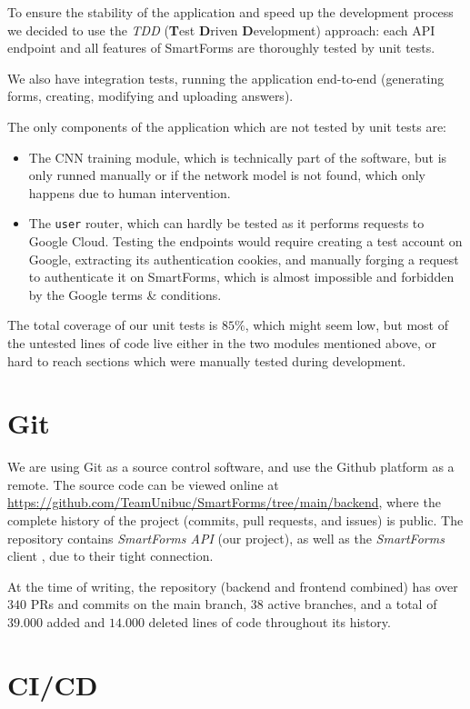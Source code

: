 \documentclass[11pt, a4paper]{report}
\def\code#1{\texttt{#1}}
\begin{document}
To ensure the stability of the application and speed up the development process we decided to use the \textit{TDD} (\textbf{T}est \textbf{D}riven \textbf{D}evelopment) approach: each API endpoint and all features of SmartForms are thoroughly tested by unit tests.

We also have integration tests, running the application end-to-end (generating forms, creating, modifying and uploading answers).

The only components of the application which are not tested by unit tests are:
\begin{itemize}
	\item The CNN training module, which is technically part of the software, but is only runned manually or if the network model is not found, which only happens due to human intervention.
	\item The \code{user} router, which can hardly be tested as it performs requests to Google Cloud. Testing the endpoints would require creating a test account on Google, extracting its authentication cookies, and manually forging a request to authenticate it on SmartForms, which is almost impossible and forbidden by the Google terms \& conditions. 
\end{itemize}

The total coverage of our unit tests is $85\%$, which might seem low, but most of the untested lines of code live either in the two modules mentioned above, or hard to reach sections which were manually tested during development.

\section{Git}

We are using Git\cite{Git} as a source control software, and use the Github platform as a remote. The source code can be viewed online at \url{https://github.com/TeamUnibuc/SmartForms/tree/main/backend}, where the complete history of the project (commits, pull requests, and issues) is public. The repository contains \textit{SmartForms API} (our project), as well as the \textit{SmartForms} client \cite{felix}, due to their tight connection.

At the time of writing, the repository (backend and frontend combined) has over $340$ PRs and commits on the main branch, $38$ active branches, and a total of $39.000$ added and $14.000$ deleted lines of code throughout its history. 


\section{CI/CD}
\end{document}
